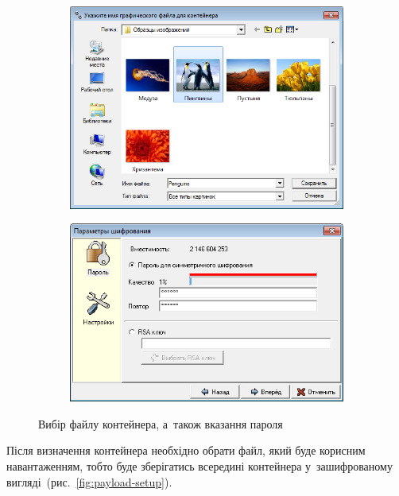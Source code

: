\documentclass[
	a4paper,
	oneside,
	BCOR = 10mm,
	DIV = 12,
	12pt,
	headings = normal,
]{scrartcl}
\newlength{\gridunitwidth}
\begin{document}
		\begin{figure}[!htbp]
			\begin{subfigure}[b]{6 \gridunitwidth - 1em / (2-1)}
				\includegraphics[width = \columnwidth]{./assets/p04.png}
				\caption{}
				\label{subfig:container-setup-file}
			\end{subfigure}%
			\hspace{1em}%
			\begin{subfigure}[b]{6 \gridunitwidth - 1em / (2-1)}
				\includegraphics[width = \columnwidth]{./assets/p05.png}
				\caption{}
				\label{subfig:container-setup-pass}
			\end{subfigure}
			\caption{Вибір файлу контейнера, а~також вказання пароля}
			\label{fig:container-setup}
		\end{figure}

		Після визначення контейнера необхідно обрати файл, який буде корисним навантаженням, тобто буде зберігатись всередині контейнера у~зашифрованому вигляді~(рис.~\ref{fig:payload-setup}).
\end{document}
